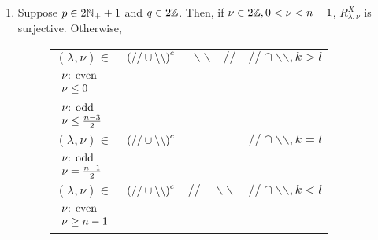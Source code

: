 \documentclass[12pt]{article} %
\theoremstyle{definition}
\theoremstyle{exampstyle} \newtheorem{examp}[theorem]{Theorem}
\newcommand{\teven}{\mbox{\textrm{: even}}}
\newcommand{\todd}{\mbox{\textrm{: odd}}}
\begin{document}
\begin{enumerate}[(1)]
	\item Suppose $p\in2\mathbb{N}_++1$ and $q\in2\mathbb{Z}$. Then, if $\nu\in2\mathbb{Z},0<\nu<n-1$, $R_{\lambda,\nu}^X$ is surjective. Otherwise,
		\hspace*{-1cm}\begin{figure}[H]
			\noindent\begin{tabular}{m{1.6cm}rrr}
	      $(\lambda,\nu)\in$&$\left(//\cup\backslash\backslash\right)^c$ & $\backslash\backslash-//$  & $//\cap\backslash\backslash,k> l$\\[0pt]
	      {\vspace{-3cm} $ \begin{array}{l}
	      \nu\teven\\ \nu\le0
      \end{array}$}&\\[0pt]
      \vspace{-3cm}$\begin{array}{l}
	      \nu\todd\\ \nu\le\frac{n-3}{2}
      \end{array}$&\\[0pt]
	      $(\lambda,\nu)\in$&$\left(//\cup\backslash\backslash\right)^c$ && $//\cap\backslash\backslash,k=l$\\[0pt]
	      \vspace{-3cm}$\begin{array}{l}\nu\todd\\\nu=\frac{n-1}{2}
	      \end{array}$&\\[0pt]
	      $(\lambda,\nu)\in$&$\left(//\cup\backslash\backslash\right)^c$ & $//-\backslash\backslash$  & $//\cap\backslash\backslash,k< l$\\[0pt]
	      \vspace{-3cm}$\begin{array}{l}\nu\teven\\\nu\ge{n-1}\end{array}$&\\[0pt]
	    \end{tabular}

\end{figure}
\end{enumerate}
\end{document}

